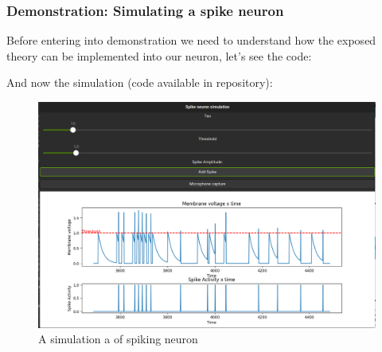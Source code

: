 \begin{frame}[allowframebreaks]
	\frametitle{Demonstration: Simulating a spike neuron}
	\par Before entering into demonstration we need to understand how the exposed theory can be implemented into our neuron, let's see the code:
	
	
	
	\par And now the simulation (code available in repository):
	
	\begin{figure}
		\centering
		\includegraphics[width=0.6\linewidth]{images/spikeNeuronSimulation}
		\caption[Spiking Neuron Simulator]{A simulation a of spiking neuron}
		\label{fig:spikeneuronsimulation}
	\end{figure}
\end{frame}